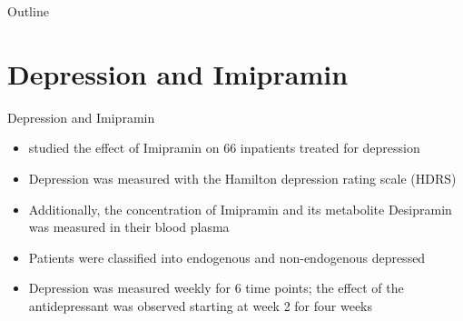 \documentclass[aspectratio=169]{beamer}
\begin{document}
\begin{frame}{Outline}
\tableofcontents
\end{frame}

\section{Depression and Imipramin}

\begin{frame}{Depression and Imipramin \citep{ReisbyGram77}}
  \begin{itemize}
    \item \citet{ReisbyGram77} studied the effect of Imipramin on 66
      inpatients treated for depression
    \item Depression was measured with the Hamilton depression rating scale
      (HDRS)
    \item Additionally, the concentration of Imipramin and its metabolite
      Desipramin was measured in their blood plasma
    \item Patients were classified into endogenous and non-endogenous
      depressed
    \item Depression was measured weekly for 6 time points; the effect of
      the antidepressant was observed starting at week 2 for four weeks
  \end{itemize}
\end{frame}
\end{document}
